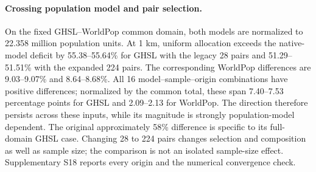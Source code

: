 \paragraph{Crossing population model and pair selection.} On the fixed GHSL--WorldPop common domain, both models are normalized to 22.358 million population units. At 1 km, uniform allocation exceeds the native-model deficit by 55.38--55.64\% for GHSL with the legacy 28 pairs and 51.29--51.51\% with the expanded 224 pairs. The corresponding WorldPop differences are 9.03--9.07\% and 8.64--8.68\%. All 16 model--sample--origin combinations have positive differences; normalized by the common total, these span 7.40--7.53 percentage points for GHSL and 2.09--2.13 for WorldPop. The direction therefore persists across these inputs, while its magnitude is strongly population-model dependent. The original approximately 58\% difference is specific to its full-domain GHSL case. Changing 28 to 224 pairs changes selection and composition as well as sample size; the comparison is not an isolated sample-size effect. Supplementary S18 reports every origin and the numerical convergence check.
